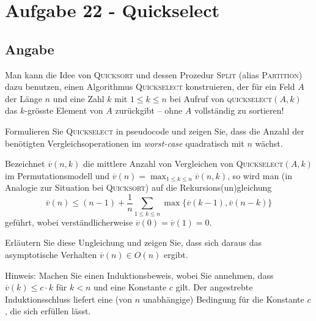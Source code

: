 \section*{Aufgabe 22 - Quickselect}

  \newcommand{\meanv}{\overline{v}}
  \lstset{ %
    language=Mathematica,
    basicstyle=\small,
    numbers=left,
    numberstyle=\small,
    numbersep=-9pt
  }
\subsection*{Angabe}
Man kann die Idee von \textsc{Quicksort} und dessen Prozedur \textsc{Split}
(alias \textsc{Partition}) dazu benutzen, einen Algorithmus
\textsc{Quickselect} konstruieren, der für ein Feld $A$ der Länge $n$ und eine
Zahl $k$ mit $1 \leq k \leq n$ bei Aufruf von \textsc{quickselect}$(A,k)$ das
$k$-grösste Element von $A$ zurückgibt -- ohne $A$ vollständig zu sortieren!
\begin{flushenum}
\item
Formulieren Sie \textsc{Quickselect} in pseudocode und zeigen Sie, dass die
Anzahl der benötigten Vergleichsoperationen im \textit{worst-case} quadratisch
mit $n$ wächst.
\item
Bezeichnet $\overline{v}(n,k)$ die mittlere Anzahl von 
Vergleichen von \textsc{Quickselect}$(A,k)$ im Permutationsmodell
und $\overline{v}(n) = \max_{1 \leq k \leq n} \overline{v}(n,k)$,
so wird man (in Analogie zur Situation bei \textsc{Quicksort})
auf die Rekursions(un)gleichung
\begin{equation*}
	\tag{$*$} \overline{v}(n) \leq (n-1)+ \frac{1}{n} \sum_{1 \leq k \leq
	n} \max\{\overline{v}(k-1),\overline{v}(n-k)\}
\end{equation*}
geführt, wobei verständlicherweise $\overline{v}(0)=\overline{v}(1)=0$.

Erläutern Sie diese Ungleichung und zeigen Sie, dass sich
daraus das asymptotische Verhalten $\overline{v}(n) \in O(n)$ ergibt.

Hinweis: Machen Sie einen Induktionsbeweis, wobei Sie annehmen, dass
$\overline{v}(k) \leq c \cdot k$ für $k < n$ und eine Konstante $c$ gilt. Der
angestrebte Induktionsschluss liefert eine (von $n$ unabhängige) Bedingung für
die Konstante $c$, die sich erfüllen lässt.

\end{flushenum}

